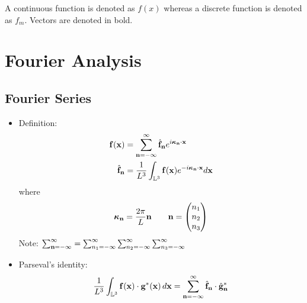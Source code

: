 \documentclass[oneside,a4paper,11pt]{article}
\begin{document}
A continuous function is denoted as $f(x)$ whereas a discrete function is denoted as $f_m$. Vectors are denoted in bold.

\section{Fourier Analysis}
\subsection{Fourier Series}
\begin{itemize}
\item Definition:
\begin{align*}
\mathbf{f}(\mathbf{x}) &= \sum_{\mathbf{n}=-\infty}^\infty \hat{\mathbf{f}}_{\mathbf{n}} e^{ i \boldsymbol\kappa_{\mathbf{n}} \cdot \mathbf{x}} \\
\hat{\mathbf{f}}_{\mathbf{n}} &= \frac{1}{L^3}\int_{\mathbb{L}^3} \mathbf{f}(\mathbf{x})e^{-i\boldsymbol\kappa_{\mathbf{n}} \cdot \mathbf{x}}d\mathbf{x}
\end{align*}
where
\[ \boldsymbol\kappa_{\mathbf{n}} = \frac{2 \pi}{L} \mathbf{n} \qquad \mathbf{n} = \begin{pmatrix} n_1 \\ n_2 \\ n_3 \end{pmatrix}  \]
Note: $ \sum_{\mathbf{n} = -\infty}^{\infty} = \sum_{n_1 = -\infty}^{\infty} \sum_{n_2 = -\infty}^{\infty} \sum_{n_3 = -\infty}^{\infty} $

\item Parseval's identity:
\[ \frac{1}{L^3} \int_{\mathbb{L}^3} \mathbf{f}(\mathbf{x}) \cdot \mathbf{g}^*(\mathbf{x}) \, d\mathbf{x} = \sum_{\mathbf{n} = -\infty}^{\infty} \hat{ \mathbf{f} }_{\mathbf{n}} \cdot \hat{ \mathbf{g} }^*_{\mathbf{n}} \]

\end{itemize}

\end{document}
